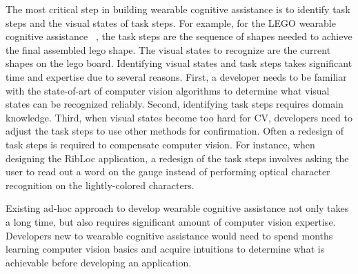 The most critical step in building wearable cognitive assistance is to identify
task steps and the visual states of task steps. For example, for the LEGO
wearable cognitive assistance ~\cite{chen2017empirical}, the task steps are the
sequence of shapes needed to achieve the final assembled lego shape. The visual
states to recognize are the current shapes on the lego board. Identifying visual
states and task steps takes significant time and expertise due to several
reasons. First, a developer needs to be familiar with the state-of-art of
computer vision algorithms to determine what visual states can be recognized
reliably. Second, identifying task steps requires domain knowledge. Third, when
visual states become too hard for CV, developers need to adjust the task steps
to use other methods for confirmation. Often a redesign of task steps is
required to compensate computer vision. For instance, when designing the RibLoc
application, a redesign of the task steps involves asking the user to read out a
word on the gauge instead of performing optical character recognition on the
lightly-colored characters.



Existing ad-hoc approach to develop wearable cognitive assistance not only takes
a long time, but also requires significant amount of computer vision expertise.
Developers new to wearable cognitive assistance would need to spend months
learning computer vision basics and acquire intuitions to determine what is
achievable before developing an application. 

